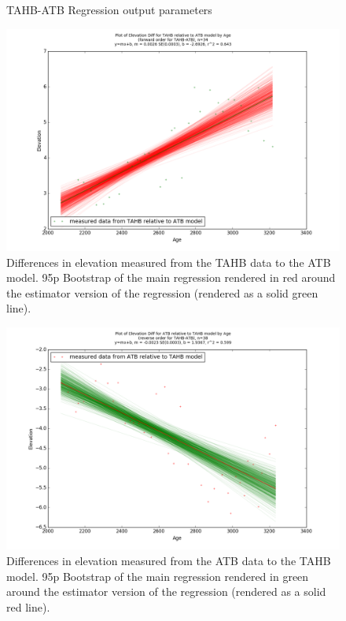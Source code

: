 \begin{figure}[H]
	\begin{flushleft}
	\end{flushleft}
	\caption{TAHB-ATB Regression output parameters}
	\label{fig:TAHBxATB_regression}
\end{figure}


\newpage

\begin{figure}[H]
	\includegraphics[width=1.7\linewidth, angle=270 ]{data/bothNonZero/withinSeventyFivePercent/gias/theGIA_TAHB_relative_to_ATB.png}
	\caption{Differences in elevation measured from the TAHB data to the ATB model. 95p Bootstrap of the main regression rendered in red around the estimator version of the regression (rendered as a solid green line).}
	\label{fig:gias_TAHBxATB}
\end{figure}
\newpage


\begin{figure}[H]
	\includegraphics[width=1.7\linewidth, angle=270 ]{data/bothNonZero/withinSeventyFivePercent/gias/theGIA_ATB_relative_to_TAHB.png}
	\caption{Differences in elevation measured from the ATB data to the TAHB model. 95p Bootstrap of the main regression rendered in green around the estimator version of the regression (rendered as a solid red line).}
	\label{fig:gias_ATBxTAHB}
\end{figure}
\newpage




